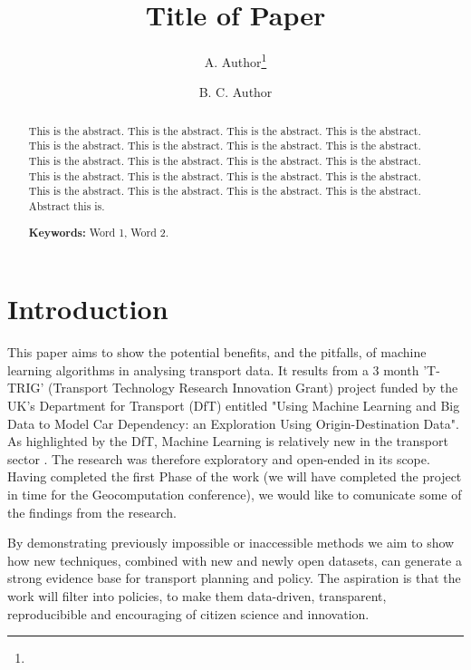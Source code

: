 \documentclass[11pt]{article}
\date{}
\title{\sffamily\fontsize{16}{0}\textbf{Title of Paper}}
\author[1]{A. Author\thanks{}}
\author[2]{B. C. Author}
\affil[1]{Address of A. Author}
\affil[2]{Address of B. Author}
\affil[*]{\texttt{Email: emailOfCorrespondingAuthor@emailAddress}}
\begin{document}
\maketitle


\begin{abstract}
\noindent
\setlength{\parindent}{0pt}

This is the abstract. This is the abstract. This is the abstract. This is the abstract. This is the abstract. This is the abstract. This is the abstract. This is the abstract. This is the abstract. This is the abstract. This is the abstract. This is the abstract. This is the abstract. This is the abstract. This is the abstract. This is the abstract. This is the abstract. This is the abstract. This is the abstract. This is the abstract. Abstract this is.

$ $ \\ {\bf Keywords:} Word 1, Word 2.

\end{abstract}



\section{Introduction}

This paper aims to show the potential benefits, and the pitfalls, of machine learning algorithms in analysing transport data. It results from a 3 month 'T-TRIG' (Transport Technology Research Innovation Grant) project funded by the UK's Department for Transport (DfT) entitled "Using Machine Learning and Big Data to Model Car Dependency: an Exploration Using Origin-Destination Data".
As highlighted by the DfT, Machine Learning is relatively new in the transport sector \citep{hagenauer_comparative_2017}. The research was therefore exploratory and open-ended in its scope. Having completed the first Phase of the work (we will have completed the project in time for the Geocomputation conference), we would like to comunicate some of the findings from the research. 


By demonstrating previously impossible or inaccessible methods we aim to show how new techniques, combined with new and newly open datasets, can generate a strong evidence base for transport planning and policy. The aspiration is that the work will filter into policies, to make them data-driven, transparent, reproducibible and encouraging of citizen science and innovation.
\end{document}
